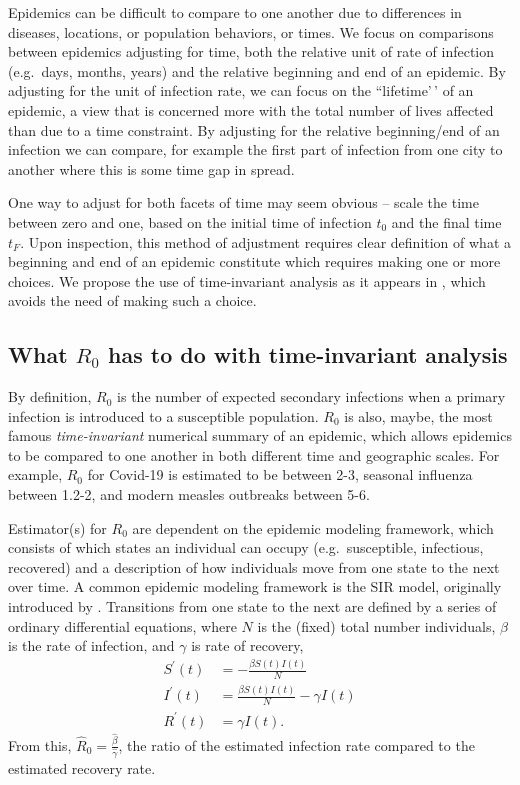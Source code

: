 \documentclass[
  shortnames]{jss}
\begin{document}
Epidemics can be difficult to compare to one another due to differences
in diseases, locations, or population behaviors, or times. We focus on
comparisons between epidemics adjusting for time, both the relative unit
of rate of infection (e.g.~days, months, years) and the relative
beginning and end of an epidemic. By adjusting for the unit of infection
rate, we can focus on the ``lifetime'\,' of an epidemic, a view that is
concerned more with the total number of lives affected than due to a
time constraint. By adjusting for the relative beginning/end of an
infection we can compare, for example the first part of infection from
one city to another where this is some time gap in spread.

One way to adjust for both facets of time may seem obvious -- scale the
time between zero and one, based on the initial time of infection
\(t_0\) and the final time \(t_F\). Upon inspection, this method of
adjustment requires clear definition of what a beginning and end of an
epidemic constitute which requires making one or more choices. We
propose the use of time-invariant analysis as it appears in
, which avoids the need of making such a choice.

\subsection[r0]{What \(R_0\) has to do with time-invariant
analysis}\label{r0}

By definition, \(R_0\) is the number of expected secondary infections
when a primary infection is introduced to a susceptible population.
\(R_0\) is also, maybe, the most famous \textit{time-invariant}
numerical summary of an epidemic, which allows epidemics to be compared
to one another in both different time and geographic scales. For
example, \(R_0\) for Covid-19 is estimated to be between 2-3, seasonal
influenza between 1.2-2, and modern measles outbreaks between 5-6.

Estimator(s) for \(R_0\) are dependent on the epidemic modeling
framework, which consists of which states an individual can occupy
(e.g.~susceptible, infectious, recovered) and a description of how
individuals move from one state to the next over time. A common epidemic
modeling framework is the SIR model, originally introduced by
\citet{kermack1927}. Transitions from one state to the next are defined
by a series of ordinary differential equations, where \(N\) is the
(fixed) total number individuals, \(\beta\) is the rate of infection,
and \(\gamma\) is rate of recovery, \begin{align}\label{eq:sir-ode}
      S^\prime(t) &= -\frac{\beta S(t)I(t)}{N} \\
      I^\prime(t) &= \frac{\beta S(t)I(t)}{N} - \gamma I(t) \nonumber\\
      R^\prime(t) &= \gamma I(t) \nonumber.
  \end{align} From this,
\(\hat{R}_0 = \frac{\hat{\beta}}{\hat{\gamma}}\), the ratio of the
estimated infection rate compared to the estimated recovery rate.
\end{document}
